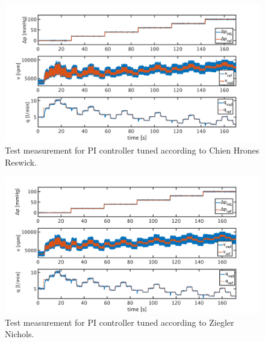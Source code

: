 \begin{figure}[ht]
  \centering
  \includegraphics[width=\textwidth]{images/chapt_5/pi_contr_chr.pdf}
  \caption[Test measurement for PI controller tuned according to Chien Hrones Reswick]{Test measurement for PI controller tuned according to Chien Hrones Reswick.}
  \label{fig:anh_6}
\end{figure}

\begin{figure}[ht]
  \centering
  \includegraphics[width=\textwidth]{images/chapt_5/pi_contr_zn.pdf}
  \caption[Test measurement for PI controller tuned according to Ziegler Nichols]{Test measurement for PI controller tuned according to Ziegler Nichols.}
  \label{fig:anh_7}
\end{figure}


